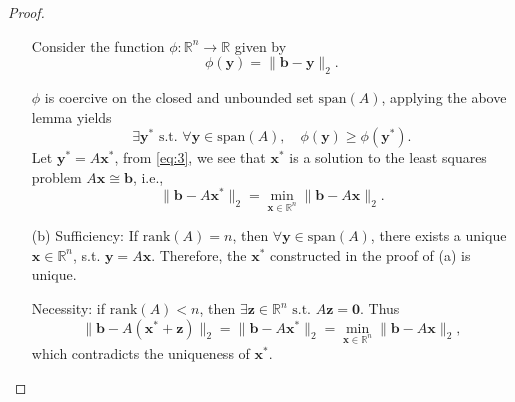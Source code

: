 \begin{proof}
\begin{itemize}
  Consider the function $\phi:\mathbb{R}^n\to\mathbb{R}$ given by
  \begin{displaymath}
    \phi(\mathbf{y}) = \|\mathbf{b}-\mathbf{y}\|_2.
  \end{displaymath}

  $\phi$ is coercive on the closed and unbounded set $\mathrm{span}(A)$,
  applying the above lemma yields
  \begin{equation}
    \label{eq:3}
    \exists \mathbf{y}^{*} \text{ s.t. } \forall \mathbf{y}\in\mathrm{span}(A),
    \quad \phi(\mathbf{y}) \ge \phi(\mathbf{y}^{*}).
  \end{equation}
  Let $\mathbf{y}^{*} = A\mathbf{x}^{*} $,
  from \eqref{eq:3}, we see that $\mathbf{x}^{*}$ is a solution to the
  least squares problem $A\mathbf{x}\cong\mathbf{b}$, i.e.,
  \begin{displaymath}
    \|\mathbf{b}-A\mathbf{x}^{*}\|_2 = \min_{\mathbf{x}\in\mathbb{R}^n}
    \|\mathbf{b}-A\mathbf{x}\|_2.
  \end{displaymath}

\item[(b)]
  Sufficiency: If $\mathrm{rank}(A)=n$,
  then $\forall \mathbf{y}\in\mathrm{span}(A)$,
  there exists a unique $\mathbf{x}\in \mathbb{R}^n$, s.t.
  $\mathbf{y}=A\mathbf{x}$.
  Therefore, the $\mathbf{x}^{*}$ constructed in the proof of (a) is unique.

  Necessity: if $\mathrm{rank}(A)<n$,
  then $\exists \mathbf{z}\in\mathbb{R}^n
  \text{ s.t. } A\mathbf{z}=\mathbf{0}$.
  Thus
  \begin{displaymath}
    \|\mathbf{b}-A(\mathbf{x}^{*}+\mathbf{z})\|_2 =
    \|\mathbf{b}-A\mathbf{x}^{*}\|_2 = \min_{\mathbf{x}\in\mathbb{R}^n}
    \|\mathbf{b}-A\mathbf{x}\|_2,
  \end{displaymath}
  which contradicts the uniqueness of $\mathbf{x}^{*}$.
\end{itemize}
\end{proof}
